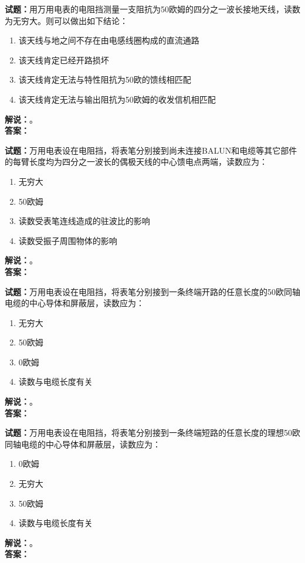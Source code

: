 \documentclass{ctexbook}
\begin{document}
\bigskip




\noindent\textbf{试题：}用万用电表的电阻挡测量一支阻抗为50欧姆的四分之一波长接地天线，读数为无穷大。则可以做出如下结论：
\begin{enumerate}[leftmargin=3em]
\item 该天线与地之间不存在由电感线圈构成的直流通路
\item 该天线肯定已经开路损坏
\item 该天线肯定无法与特性阻抗为50欧的馈线相匹配
\item 该天线肯定无法与输出阻抗为50欧姆的收发信机相匹配
\end{enumerate}
\noindent\textbf{解说：}\textbf{}。\\\noindent\textbf{答案：}

\bigskip




\noindent\textbf{试题：}万用电表设在电阻挡，将表笔分别接到尚未连接BALUN和电缆等其它部件的每臂长度均为四分之一波长的偶极天线的中心馈电点两端，读数应为：
\begin{enumerate}[leftmargin=3em]
\item 无穷大
\item 50欧姆
\item 读数受表笔连线造成的驻波比的影响
\item 读数受振子周围物体的影响
\end{enumerate}
\noindent\textbf{解说：}\textbf{}。\\\noindent\textbf{答案：}

\bigskip




\noindent\textbf{试题：}万用电表设在电阻挡，将表笔分别接到一条终端开路的任意长度的50欧同轴电缆的中心导体和屏蔽层，读数应为：
\begin{enumerate}[leftmargin=3em]
\item 无穷大
\item 50欧姆
\item 0欧姆
\item 读数与电缆长度有关
\end{enumerate}
\noindent\textbf{解说：}\textbf{}。\\\noindent\textbf{答案：}

\bigskip




\noindent\textbf{试题：}万用电表设在电阻挡，将表笔分别接到一条终端短路的任意长度的理想50欧同轴电缆的中心导体和屏蔽层，读数应为：
\begin{enumerate}[leftmargin=3em]
\item 0欧姆
\item 无穷大
\item 50欧姆
\item 读数与电缆长度有关
\end{enumerate}
\noindent\textbf{解说：}\textbf{}。\\\noindent\textbf{答案：}
\end{document}
